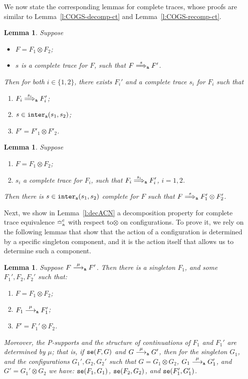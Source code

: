 \documentclass[11pt,a4paper]{amsart}
\theoremstyle{plain}
\theoremstyle{definition}
\theoremstyle{defC}
\theoremstyle{thmC}
\theoremstyle{plain}
\numberwithin{equation}{section}
\newcommand{\wrt}{with respect to\xspace}  %
\newcommand{\tr}{s}
\newcommand{\Supports}{supports\xspace}      %
\newcommand{\appendCon}[2]{#1 \otimes #2}
\newcommand{\okC}[2]{{\tt se}(#1,#2)}  %
\newcommand{\rmm}[1]{{\tt{\lowercase{#1}}}}
\newcommand{\genarr}[2]{\mathrel{\stackrel{{#1}}{\longrightarrow}_{\rmm{\lowercase{#2}}}}}
\newcommand{\genArr}[2]{\mathrel{\stackrel{{#1}}{\Longrightarrow}_{\rmm{\lowercase{#2}}}}}  %
\newcommand{\arrA}[1]{\genarr{#1}{A}}  %
\newcommand{\ArrA}[1]{\genArr{#1}{A}}  %
\newcommand{\genTEcomp}[1]{\mathrel{\bumpeq^{\rm c}_{\rm{\lowercase{#1}}}}} %
\newcommand{\TEc}{\genTEcomp{A}}        %
\newcommand{\TEpc}{\genTEcomp{C}}        %
\newcommand{\interlA}[2]{{\tt inter_{a}}( #1, #2)}
\newcommand{\FF}{F}
\newcommand{\GG}{G}
\theoremstyle{plain}
\newtheorem{lemma}[thm]{Lemma}
\theoremstyle{definition}
\begin{document}
\noindent
We now state the corresponding lemmas for complete traces,
whose proofs are similar to Lemma~\ref{l:COGS-decomp-ct} and Lemma~\ref{l:COGS-recomp-ct}.
\begin{lemma}
\label{l:AOGS-decomp-ct}
Suppose
\begin{itemize}
  \item $\FF  = \appendCon{\FF_1}{\FF_2}$;
  \item $\tr$ is a complete trace for $\FF$,
  such that $\FF \ArrA \tr \FF'$.
\end{itemize} 
Then for both $i \in \{1,2\}$,
there exists $\FF_i'$ and a complete trace $\tr_i$
for $\FF_i$ such that 
\begin{enumerate}
  \item ${\FF_i} \ArrA{\tr_i} \FF_i'$;
  \item $\tr \in \interlA{\tr_1}{\tr_2}$; 
  \item $\FF' = \appendCon{\FF'_1}{\FF'_2}$.
\end{enumerate}
\end{lemma}              

\begin{lemma}
  \label{l:AOGS-recomp-ct}
  Suppose 
  \begin{enumerate}
    \item $\FF = \FF_1 \otimes \FF_2$;   
    \item $\tr_i$ a complete trace for $\FF_i$,
    such that $\FF_i \ArrA{\tr_i} \FF_i'$,
    $i=1,2$. 
  \end{enumerate} 
  Then there is 
   $\tr \in \interlA{\tr_1}{\tr_2}$ complete for $\FF$ such that
  $\FF \ArrA{\tr}{\FF'_1} \otimes {\FF'_2}$. 
\end{lemma}
\noindent
Next, we show in Lemma~\ref{l:decACN} a decomposition property for 
complete trace equivalence $\TEc$ \wrt $\otimes$ on configurations.
%
To prove it, we rely on the following lemmas
that show that the action of a configuration is 
determined by a specific singleton component, 
and it is the action itself that allows us to determine such a component.

\begin{lemma}
\label{l:decNsig}
Suppose $\FF \arrA\mu \FF'$.
Then there is a singleton $\FF_1$, and some $\FF_1',\FF_2,\FF_2'$ 
such that:
\begin{enumerate}
\item $\FF =
 {\FF_1} \otimes {\FF_2}$;
\item $\FF_1 \arrA\mu \FF_1'$;
\item $\FF' =
 {\FF_1'} \otimes {\FF_2}$.
\end{enumerate}
\noindent
Moreover, the P-\Supports and the structure of continuations of $\FF_1$ and $\FF_1'$  
are determined by 
$\mu$; that is, 
if  $\okC \FF\GG$ and
 $\GG \arrA\mu \GG'$, then for  
 the singleton $\GG_1$, and the configurations $\GG_1',\GG_2,\GG_2'$ such that
 $\GG = \appendCon{\GG_1}{\GG_2}$,
 $\GG_1 \arrA\mu \GG_1'$, and 
 $\GG' = \appendCon{\GG_1'}{\GG_2}$ we have: 
 $\okC{\FF_1}{\GG_1}$, $\okC{\FF_2}{\GG_2}$, and 
$\okC{\FF_1'}{\GG_1'}$.  
 \end{lemma} 
\end{document}
